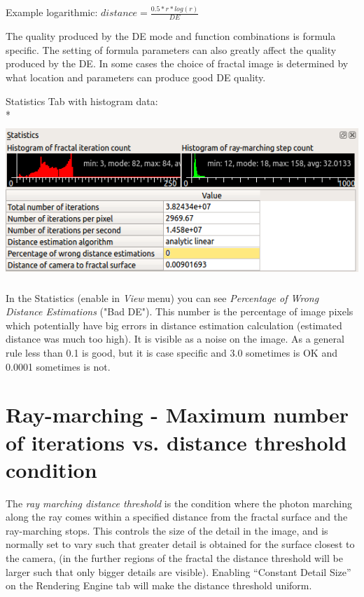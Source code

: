 Example logarithmic: $ distance = \frac{0.5 * r * log(r)}{DE} $

The quality produced by the DE mode and function combinations is formula
specific. The setting of formula parameters can also greatly affect the
quality produced by the DE. In some cases the choice of fractal image is
determined by what location and parameters can produce good DE quality.

Statistics Tab with histogram data:\\*
\includegraphics[width=5.72083in,height=2.32569in]{img/manual/media/image6.png}

In the Statistics (enable in \emph{View} menu) you can see \emph{Percentage of Wrong
Distance Estimations} ("Bad DE"). This number is the percentage of image pixels which potentially have big errors in distance estimation calculation (estimated distance was much too high). It is visible as a noise on the image. As a general rule less than 0.1 is
good, but it is case specific and 3.0 sometimes is OK and 0.0001
sometimes is not.

\section{Ray-marching - Maximum number of iterations vs. distance
threshold
condition}\label{ray-marching---maximum-number-of-iterations-vs.-distance-threshold-condition}

The \emph{ray marching distance threshold} is the condition where the
photon marching along the ray comes within a specified distance from the
fractal surface and the ray-marching stops. This controls the size of
the detail in the image, and is normally set to vary such that greater
detail is obtained for the surface closest to the camera, (in the
further regions of the fractal the distance threshold will be larger
such that only bigger details are visible). Enabling ``Constant Detail
Size'' on the Rendering Engine tab will make the distance threshold
uniform.

